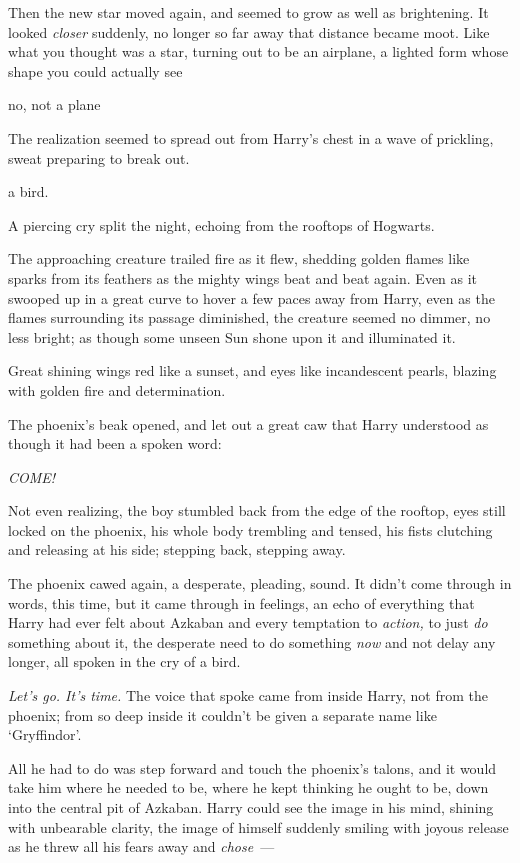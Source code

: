 Then the new star moved again, and seemed to grow as well as brightening. It
looked \emph{closer} suddenly, no longer so far away that distance became moot.
Like what you thought was a star, turning out to be an airplane, a lighted form
whose shape you could actually see{\el}

{\el} no, not a plane{\el}

The realization seemed to spread out from Harry's chest in a wave of prickling,
sweat preparing to break out.

{\el} a bird.

A piercing cry split the night, echoing from the rooftops of Hogwarts.

The approaching creature trailed fire as it flew, shedding golden flames like
sparks from its feathers as the mighty wings beat and beat again. Even as it
swooped up in a great curve to hover a few paces away from Harry, even as the
flames surrounding its passage diminished, the creature seemed no dimmer, no
less bright; as though some unseen Sun shone upon it and illuminated it.

Great shining wings red like a sunset, and eyes like incandescent pearls,
blazing with golden fire and determination.

The phoenix's beak opened, and let out a great caw that Harry understood as
though it had been a spoken word:

\emph{COME!}

Not even realizing, the boy stumbled back from the edge of the rooftop, eyes
still locked on the phoenix, his whole body trembling and tensed, his fists
clutching and releasing at his side; stepping back, stepping away.

The phoenix cawed again, a desperate, pleading, sound. It didn't come through
in words, this time, but it came through in feelings, an echo of everything
that Harry had ever felt about Azkaban and every temptation to \emph{action,}
to just \emph{do} something about it, the desperate need to do something
\emph{now} and not delay any longer, all spoken in the cry of a bird.

\emph{Let's go. It's time.} The voice that spoke came from inside Harry, not
from the phoenix; from so deep inside it couldn't be given a separate name like
`Gryffindor'.

All he had to do was step forward and touch the phoenix's talons, and it would
take him where he needed to be, where he kept thinking he ought to be, down
into the central pit of Azkaban. Harry could see the image in his mind, shining
with unbearable clarity, the image of himself suddenly smiling with joyous
release as he threw all his fears away and \emph{chose}~---

